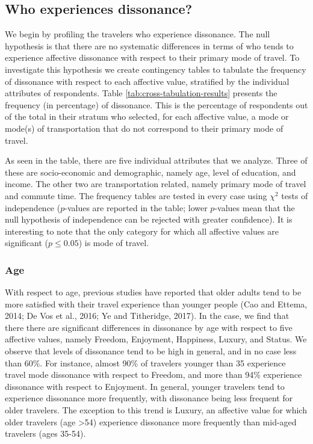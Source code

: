\documentclass[]{elsarticle} %
\begin{document}
\hypertarget{who-experiences-dissonance}{%
\subsection{Who experiences
dissonance?}\label{who-experiences-dissonance}}

We begin by profiling the travelers who experience dissonance. The null
hypothesis is that there are no systematic differences in terms of who
tends to experience affective dissonance with respect to their primary
mode of travel. To investigate this hypothesis we create contingency
tables to tabulate the frequency of dissonance with respect to each
affective value, stratified by the individual attributes of respondents.
Table \ref{tab:cross-tabulation-results} presents the frequency (in
percentage) of dissonance. This is the percentage of respondents out of
the total in their stratum who selected, for each affective value, a
mode or mode(s) of transportation that do not correspond to their
primary mode of travel.

As seen in the table, there are five individual attributes that we
analyze. Three of these are socio-economic and demographic, namely age,
level of education, and income. The other two are transportation
related, namely primary mode of travel and commute time. The frequency
tables are tested in every case using \(\chi^2\) tests of independence
(\(p\)-values are reported in the table; lower \(p\)-values mean that
the null hypothesis of independence can be rejected with greater
confidence). It is interesting to note that the only category for which
all affective values are significant (\(p\leq0.05\)) is mode of travel.

\hypertarget{age}{%
\subsubsection{Age}\label{age}}

With respect to age, previous studies have reported that older adults
tend to be more satisfied with their travel experience than younger
people (Cao and Ettema, 2014; De Vos et al., 2016; Ye and Titheridge,
2017). In the case, we find that there there are significant differences
in dissonance by age with respect to five affective values, namely
Freedom, Enjoyment, Happiness, Luxury, and Status. We observe that
levels of dissonance tend to be high in general, and in no case less
than 60\%. For instance, almost 90\% of travelers younger than 35
experience travel mode dissonance with respect to Freedom, and more than
94\% experience dissonance with respect to Enjoyment. In general,
younger travelers tend to experience dissonance more frequently, with
dissonance being less frequent for older travelers. The exception to
this trend is Luxury, an affective value for which older travelers (age
\textgreater54) experience dissonance more frequently than mid-aged
travelers (ages 35-54).
\end{document}
